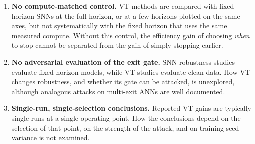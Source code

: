 \begin{enumerate}
    \item \textbf{No compute-matched control.} VT methods are compared with fixed-horizon SNNs at the full horizon, or at a few horizons plotted on the same axes, but not systematically with the fixed horizon that uses the same measured compute. Without this control, the efficiency gain of choosing \emph{when} to stop cannot be separated from the gain of simply stopping earlier.
    \item \textbf{No adversarial evaluation of the exit gate.} SNN robustness studies evaluate fixed-horizon models, while VT studies evaluate clean data. How VT changes robustness, and whether its gate can be attacked, is unexplored, although analogous attacks on multi-exit ANNs are well documented.
    \item \textbf{Single-run, single-selection conclusions.} Reported VT gains are typically single runs at a single operating point. How the conclusions depend on the selection of that point, on the strength of the attack, and on training-seed variance is not examined.
\end{enumerate}

